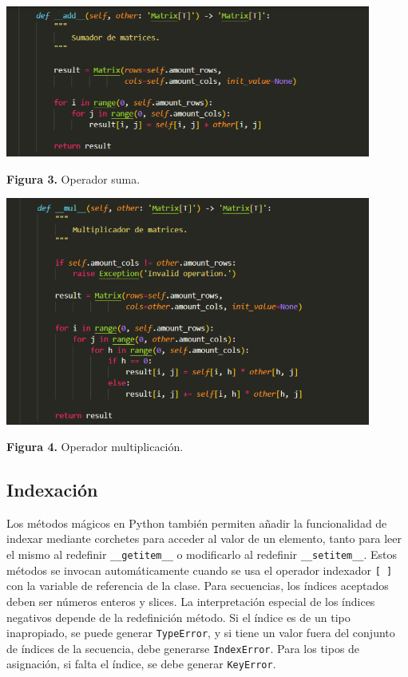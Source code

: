 \documentclass[10pt]{article} %
\newcommand{\csl}[1]{\colorbox{backcolour}{\texttt{#1}}}
\newcommand{\imgcaption}[2]{\tiny \textbf{Figura #1.} #2.}
\newcommand{\mgc}[2][]{\colorbox{backcolour}{\texttt{\_\_#2\_\_#1}}}
\begin{document}
\begin{center}
	\includegraphics[width=12cm]{add.png} 
	
	\imgcaption{3}{Operador suma}
\end{center}

\begin{center}
	\includegraphics[width=12cm]{mul.png}
	
	\imgcaption{4}{Operador multiplicaci\'on}
\end{center}

\subsection{Indexaci\'on}
Los m\'etodos m\'agicos en Python tambi\'en permiten a\~nadir la funcionalidad de indexar mediante corchetes para acceder al valor de un elemento, tanto para leer el mismo al redefinir \mgc{getitem} o modificarlo al redefinir \mgc{setitem}. Estos m\'etodos se invocan automáticamente cuando se usa el operador indexador \csl{[ ]} con la variable de referencia de la clase. Para secuencias, los \'indices aceptados deben ser números enteros y slices. La interpretación especial de los índices negativos depende de la redefinici\'on método. Si el \'indice es de un tipo inapropiado, se puede generar \csl{TypeError}, y si tiene un valor fuera del conjunto de índices de la secuencia, debe generarse \csl{IndexError}. Para los tipos de asignación, si falta el \'indice, se debe generar \csl{KeyError}.
\end{document}
